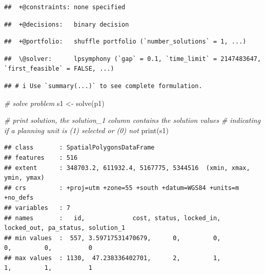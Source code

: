 \documentclass[
  12pt,
]{book}
\newenvironment{Shaded}{\begin{snugshade}}{\end{snugshade}}
\newcommand{\CommentTok}[1]{\textcolor[rgb]{0.56,0.35,0.01}{\textit{#1}}}
\newcommand{\FunctionTok}[1]{\textcolor[rgb]{0.00,0.00,0.00}{#1}}
\newcommand{\NormalTok}[1]{#1}
\newcommand{\OtherTok}[1]{\textcolor[rgb]{0.56,0.35,0.01}{#1}}
\newcommand{\SpecialCharTok}[1]{\textcolor[rgb]{0.00,0.00,0.00}{#1}}
\begin{document}
\begin{verbatim}
##  +@constraints: none specified
\end{verbatim}

\begin{verbatim}
##  +@decisions:   binary decision
\end{verbatim}

\begin{verbatim}
##  +@portfolio:   shuffle portfolio (`number_solutions` = 1, ...)
\end{verbatim}

\begin{verbatim}
##  \@solver:      lpsymphony (`gap` = 0.1, `time_limit` = 2147483647, `first_feasible` = FALSE, ...)
\end{verbatim}

\begin{verbatim}
## # i Use `summary(...)` to see complete formulation.
\end{verbatim}

\begin{Shaded}
\begin{Highlighting}[]
\CommentTok{\# solve problem}
\NormalTok{s1 }\OtherTok{\textless{}{-}} \FunctionTok{solve}\NormalTok{(p1)}

\CommentTok{\# print solution, the solution\_1 column contains the solution values}
\CommentTok{\# indicating if a planning unit is (1) selected or (0) not}
\FunctionTok{print}\NormalTok{(s1)}
\end{Highlighting}
\end{Shaded}

\begin{verbatim}
## class       : SpatialPolygonsDataFrame 
## features    : 516 
## extent      : 348703.2, 611932.4, 5167775, 5344516  (xmin, xmax, ymin, ymax)
## crs         : +proj=utm +zone=55 +south +datum=WGS84 +units=m +no_defs 
## variables   : 7
## names       :   id,             cost, status, locked_in, locked_out, pa_status, solution_1 
## min values  :  557, 3.59717531470679,      0,         0,          0,         0,          0 
## max values  : 1130,  47.238336402701,      2,         1,          1,         1,          1
\end{verbatim}

\begin{Shaded}
\end{Shaded}
\end{document}
